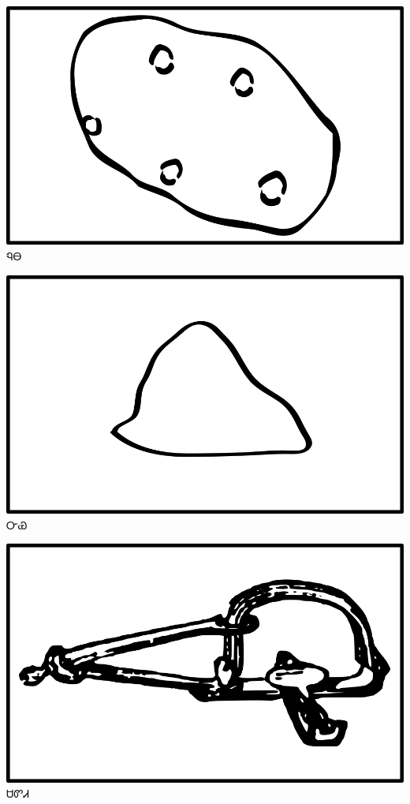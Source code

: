 \documentclass[avery5371]{flashcards}%
\begin{document}
    \begin{flashcard}{
        \includegraphics[width=0.95\columnwidth,height=.51\columnwidth,keepaspectratio]{../artwork/objects-neutral/nuna}
    }
        \Huge ᏄᎾ
    \end{flashcard}

    \begin{flashcard}{
        \includegraphics[width=0.95\columnwidth,height=.51\columnwidth,keepaspectratio]{../artwork/objects-neutral/nvya}
    }
        \Huge ᏅᏯ
    \end{flashcard}

    \begin{flashcard}{
        \includegraphics[width=0.95\columnwidth,height=.51\columnwidth,keepaspectratio]{../artwork/objects-neutral/sadvdi}
    }
        \Huge ᏌᏛᏗ
    \end{flashcard}
\end{document}
